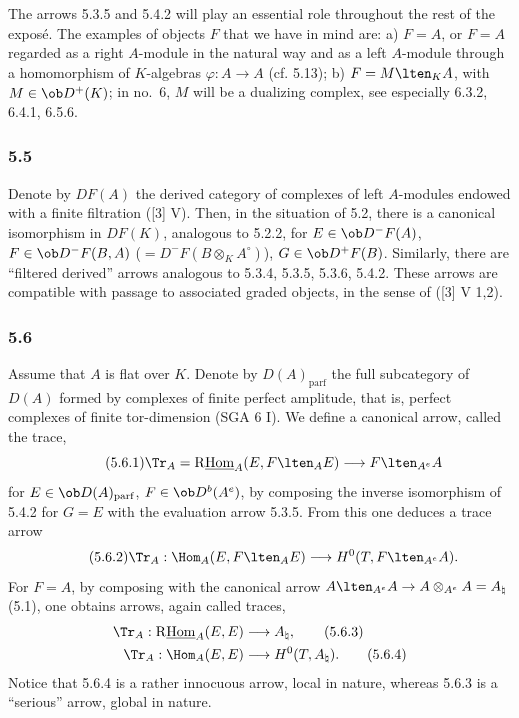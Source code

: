 The arrows 5.3.5 and 5.4.2 will play an essential role throughout the rest of the expos\'e. The examples of objects $F$ that we have in mind are: a) $F=A$, or $F=A$ regarded as a right $A$-module in the natural way and as a left $A$-module through a homomorphism of $K$-algebras $\varphi:A\to A$ (cf. 5.13); b) $F=M\lten_KA$, with $M\in\ob D^+(K)$; in no.~6, $M$ will be a dualizing complex, see especially 6.3.2, 6.4.1, 6.5.6.

\subsubsection*{5.5}

Denote by $DF(A)$ the derived category of complexes of left $A$-modules endowed with a finite filtration ([3] V). Then, in the situation of 5.2, there is a canonical isomorphism in $DF(K)$, analogous to 5.2.2, for $E\in\ob D^-F(A)$, $F\in\ob D^-F(B,A)$ ($=D^-F(B\otimes_KA^\circ)$), $G\in\ob D^+F(B)$. Similarly, there are ``filtered derived'' arrows analogous to 5.3.4, 5.3.5, 5.3.6, 5.4.2. These arrows are compatible with passage to associated graded objects, in the sense of ([3] V 1,2).

\subsubsection*{5.6}

Assume that $A$ is flat over $K$. Denote by $D(A)_{\mathrm{parf}}$ the full subcategory of $D(A)$ formed by complexes of finite perfect amplitude, that is, perfect complexes of finite tor-dimension (SGA 6 I). We define a canonical arrow, called the trace,
\begin{equation}\tag{5.6.1}
\Tr_A=\mathrm{R}\underline{\mathrm{Hom}}_A(E,F\lten_AE)\longrightarrow F\lten_{A^e}A
\end{equation}
for $E\in\ob D(A)_{\mathrm{parf}}$, $F\in\ob D^b(A^e)$, by composing the inverse isomorphism of 5.4.2 for $G=E$ with the evaluation arrow 5.3.5. From this one deduces a trace arrow
\begin{equation}\tag{5.6.2}
\Tr_A:\Hom_A(E,F\lten_AE)\longrightarrow H^0(T,F\lten_{A^e}A).
\end{equation}
For $F=A$, by composing with the canonical arrow $A\lten_{A^e}A\to A\otimes_{A^e}A=A_\natural$ (5.1), one obtains arrows, again called traces,
\begin{align}
\Tr_A:\mathrm{R}\underline{\mathrm{Hom}}_A(E,E)&\longrightarrow A_\natural,\tag{5.6.3}\\
\Tr_A:\Hom_A(E,E)&\longrightarrow H^0(T,A_\natural).\tag{5.6.4}
\end{align}
Notice that 5.6.4 is a rather innocuous arrow, local in nature, whereas 5.6.3 is a ``serious'' arrow, global in nature.

